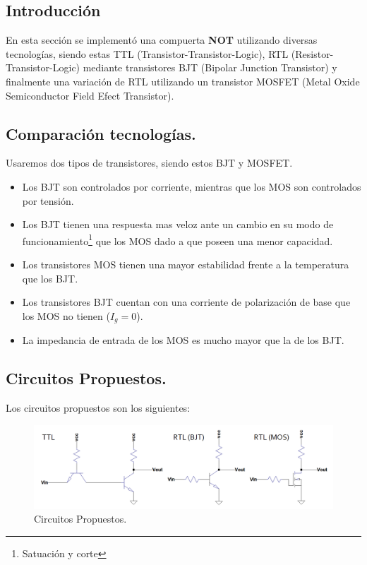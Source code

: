 \documentclass[a4paper]{article}
\begin{document}
\subsection{Introducción}
En esta sección se implementó una compuerta \textbf{NOT} utilizando diversas tecnologías, siendo estas TTL (Transistor-Transistor-Logic), RTL (Resistor-Transistor-Logic) mediante transistores BJT (Bipolar Junction Transistor) y finalmente una variación de RTL utilizando un transistor MOSFET (Metal Oxide Semiconductor Field Efect Transistor).
\subsection{Comparación tecnologías.}
Usaremos dos tipos de transistores, siendo estos BJT y MOSFET.
\begin{itemize}
\item Los BJT son controlados por corriente, mientras que los MOS son controlados por tensión.
\item Los BJT tienen una respuesta mas veloz ante un cambio en su modo de funcionamiento\footnote{Satuación y corte} que los MOS dado a que poseen una menor capacidad.
\item Los transistores MOS tienen una mayor estabilidad frente a la temperatura que los BJT.	
\item Los transistores BJT cuentan con una corriente de polarización de base que los MOS no tienen ($I_g =0$).
\item La impedancia de entrada de los MOS es mucho mayor que la de los BJT.
\end{itemize}
\subsection{Circuitos Propuestos.}
Los circuitos propuestos son los siguientes:

\begin{figure}[H]	
	\centering
	\includegraphics[width=\textwidth]{ImagenesEjercicio1/CircuitosPropuestos.PNG}
	\caption{Circuitos Propuestos.}
	\label{fig:circprop}
\end{figure}
\end{document}
